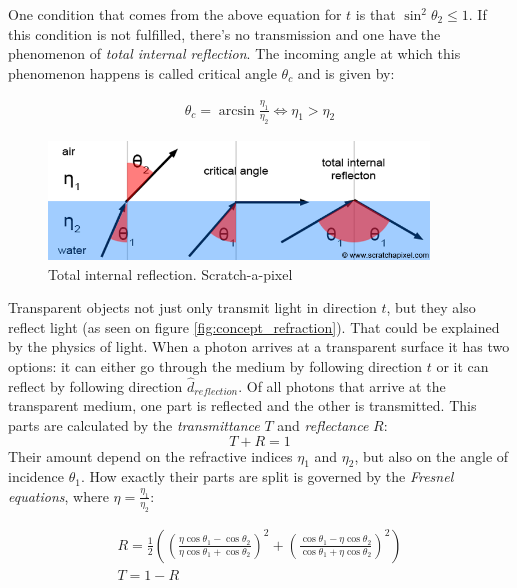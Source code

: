 \documentclass{article}
\begin{document}
One condition that comes from the above equation for $t$ is that $\sin^{2} \theta_{2} \leq 1$. If this condition is not fulfilled, there's no transmission and one have the phenomenon of \textit{total internal reflection}. The incoming angle at which this phenomenon happens is called critical angle $\theta_{c}$ and is given by:

\begin{align}
\theta_{c} = \arcsin \frac{\eta_{1}}{\eta_{2}} \iff \eta_{1} > \eta_{2}
\end{align}

\begin{figure}[h]
	\centering	
	\includegraphics[width=0.9\textwidth]{tir}
	\caption{Total internal reflection. Scratch-a-pixel}
	\label{fig:internal_refraction}
\end{figure}

Transparent objects not just only transmit light in direction $t$, but they also reflect light (as seen on figure \ref{fig:concept_refraction}). That could be explained by the physics of light. When a photon arrives at a transparent surface it has two options: it can either go through the medium by following direction $t$ or it can reflect by following direction $\hat{d}_{reflection}$. Of all photons that arrive at the transparent medium, one part is reflected and the other is transmitted. This parts are calculated by the \textit{transmittance} $T$ and \textit{reflectance} $R$: $$T + R = 1$$ Their amount depend on the refractive indices $\eta_{1}$ and $\eta_{2}$, but also on the angle of incidence $\theta_{1}$. How exactly their parts are split is governed by the \textit{Fresnel equations}, where $\eta = \frac{\eta_{1}}{\eta_{2}}$: \cite{de2004reflections}

\begin{gather}
R = \frac{1}{2}((\frac{\eta \cos \theta_{1} - \cos \theta_{2}}{\eta \cos \theta_{1} + \cos \theta_{2}})^2 + (\frac{\cos \theta_{1} - \eta \cos \theta_{2}}{\cos \theta_{1} + \eta \cos \theta_{2}})^2) \\
T = 1 - R
\end{gather}
\end{document}
